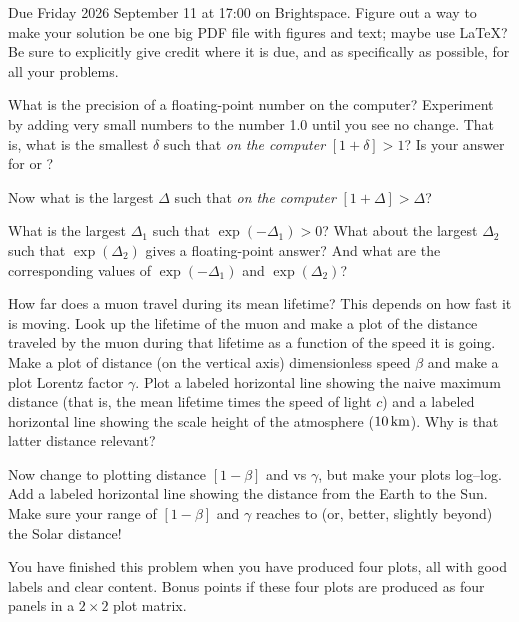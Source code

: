 \documentclass[12pt]{article}
\begin{document}
Due Friday 2026 September 11 at 17:00 on Brightspace.
Figure out a way to make your solution be one big PDF file with figures and text; maybe use \LaTeX?
Be sure to explicitly give credit where it is due, and as specifically as possible, for all your problems.

\begin{problem}
  \subpart What is the precision of a floating-point number on the computer?
  Experiment by adding very small numbers to the number 1.0 until you see no change.
  That is, what is the smallest $\delta$ such that \emph{on the computer} $[1+\delta]>1$?
  Is your answer for  or ?

  \subpart Now what is the largest $\Delta$ such that \emph{on the computer} $[1+\Delta]>\Delta$?

  \subpart What is the largest $\Delta_1$ such that $\exp(-\Delta_1)>0$?
  What about the largest $\Delta_2$ such that $\exp(\Delta_2)$ gives a floating-point answer?
  And what are the corresponding values of $\exp(-\Delta_1)$ and $\exp(\Delta_2)$?
\end{problem}

\begin{problem}
  \subpart How far does a muon travel during its mean lifetime?
  This depends on how fast it is moving.
  Look up the lifetime of the muon and make a plot of the distance traveled by the muon during that lifetime as a function of the speed it is going.
  Make a plot of distance (on the vertical axis) \vs{} dimensionless speed $\beta$ and make a plot \vs{} Lorentz factor $\gamma$.
  Plot a labeled horizontal line showing the naive maximum distance (that is, the mean lifetime times the speed of light $c$) and a labeled horizontal line showing the scale height of the atmosphere ($10\,\mathrm{km}$).
  Why is that latter distance relevant?

  \subpart Now change to plotting distance \vs{} $[1-\beta]$ and vs $\gamma$, but make your plots log--log.
  Add a labeled horizontal line showing the distance from the Earth to the Sun.
  Make sure your range of $[1-\beta]$ and $\gamma$ reaches to (or, better, slightly beyond) the Solar distance!
\end{problem}

\begin{note}
  You have finished this problem when you have produced four plots, all with good labels and clear content.
  Bonus points if these four plots are produced as four panels in a $2\times 2$ plot matrix.
\end{note}
\end{document}
